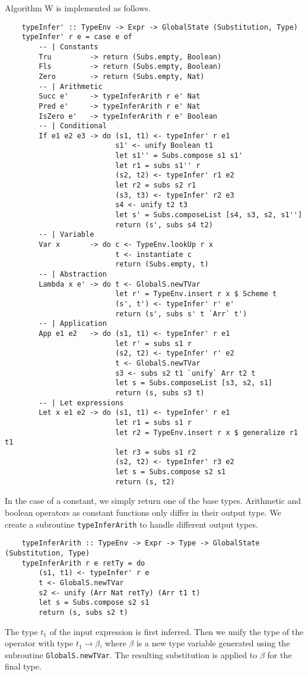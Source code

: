 Algorithm W is implemented as follows.
\begin{lstlisting}
    typeInfer' :: TypeEnv -> Expr -> GlobalState (Substitution, Type)
    typeInfer' r e = case e of 
        -- | Constants
        Tru         -> return (Subs.empty, Boolean)
        Fls         -> return (Subs.empty, Boolean)
        Zero        -> return (Subs.empty, Nat)
        -- | Arithmetic
        Succ e'     -> typeInferArith r e' Nat
        Pred e'     -> typeInferArith r e' Nat
        IsZero e'   -> typeInferArith r e' Boolean
        -- | Conditional
        If e1 e2 e3 -> do (s1, t1) <- typeInfer' r e1
                          s1' <- unify Boolean t1
                          let s1'' = Subs.compose s1 s1'
                          let r1 = subs s1'' r
                          (s2, t2) <- typeInfer' r1 e2
                          let r2 = subs s2 r1 
                          (s3, t3) <- typeInfer' r2 e3
                          s4 <- unify t2 t3
                          let s' = Subs.composeList [s4, s3, s2, s1'']  
                          return (s', subs s4 t2)
        -- | Variable
        Var x       -> do c <- TypeEnv.lookUp r x
                          t <- instantiate c
                          return (Subs.empty, t)
        -- | Abstraction
        Lambda x e' -> do t <- GlobalS.newTVar
                          let r' = TypeEnv.insert r x $ Scheme t
                          (s', t') <- typeInfer' r' e'
                          return (s', subs s' t `Arr` t') 
        -- | Application
        App e1 e2   -> do (s1, t1) <- typeInfer' r e1
                          let r' = subs s1 r
                          (s2, t2) <- typeInfer' r' e2
                          t <- GlobalS.newTVar
                          s3 <- subs s2 t1 `unify` Arr t2 t
                          let s = Subs.composeList [s3, s2, s1]
                          return (s, subs s3 t)
        -- | Let expressions
        Let x e1 e2 -> do (s1, t1) <- typeInfer' r e1
                          let r1 = subs s1 r 
                          let r2 = TypeEnv.insert r x $ generalize r1 t1
                          let r3 = subs s1 r2 
                          (s2, t2) <- typeInfer' r3 e2
                          let s = Subs.compose s2 s1
                          return (s, t2)
\end{lstlisting}
In the case of a constant, we simply return one of the base types. 
Arithmetic and boolean operators as constant functions only differ in their 
output type. We create a subroutine \lstinline{typeInferArith} to handle 
different output types. 
\begin{lstlisting}
    typeInferArith :: TypeEnv -> Expr -> Type -> GlobalState (Substitution, Type)
    typeInferArith r e retTy = do 
        (s1, t1) <- typeInfer' r e
        t <- GlobalS.newTVar
        s2 <- unify (Arr Nat retTy) (Arr t1 t)
        let s = Subs.compose s2 s1 
        return (s, subs s2 t)
\end{lstlisting}
The type $t_1$ of the input expression is first inferred. Then we unify 
the type of the operator with type $t_1 \rightarrow \beta$, where $\beta$ 
is a new type variable generated using the subroutine \lstinline{GlobalS.newTVar}. 
The resulting substitution is applied to $\beta$ for the final type.

